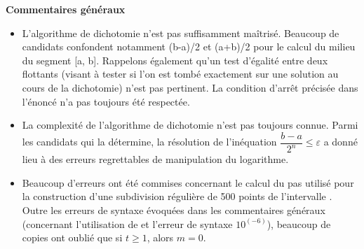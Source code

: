 \documentclass[10pt,fleqn]{article} %
\begin{document}

\pagestyle{fancy}
\thispagestyle{plain}


\def\columnseprulecolor{\color{ocre}}
\setlength{\columnseprule}{0.4pt} 



\vspace{6cm}


\textbf{Commentaires généraux}

\begin{itemize}
\item  L’algorithme de dichotomie n’est pas suffisamment maîtrisé. Beaucoup de candidats confondent
notamment (b-a)/2 et (a+b)/2 pour le calcul du milieu du segment [a, b]. Rappelons également qu’un
test d’égalité entre deux flottants (visant à tester si l’on est tombé exactement sur une solution au
cours de la dichotomie) n’est pas pertinent. La condition d’arrêt précisée dans l’énoncé n’a pas toujours
été respectée.
\item La complexité de l’algorithme de dichotomie n’est pas toujours connue. Parmi les candidats
qui la détermine, la résolution de l’inéquation $\dfrac{b-a}{2^n}\leq \varepsilon$ a donné lieu à des erreurs regrettables de
manipulation du logarithme.
\item Beaucoup d’erreurs ont été commises concernant le calcul du pas utilisé pour la construction
d’une subdivision régulière de 500 points de l’intervalle \cde{[t1, t2]}. Outre les erreurs de syntaxe évoquées
dans les commentaires généraux (concernant l’utilisation de  et l’erreur de syntaxe $10^(-6)$),
beaucoup de copies ont oublié que si $t \geq 1$, alors $m = 0$.
\end{itemize}



%
\end{document}

